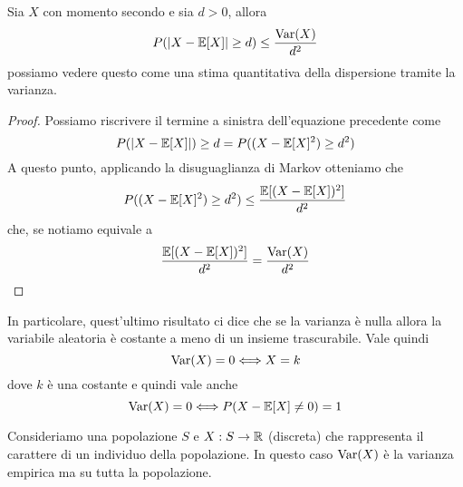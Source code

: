 \begin{proposition}
	Sia $X$ con momento secondo e sia $d > 0$, allora
	\[ P(|X - \mathbb{E}[X]| \geq d) \leq \frac{\operatorname{Var}(X)}{d^2} \]
	possiamo vedere questo come una stima quantitativa della dispersione tramite la varianza.
	\begin{proof}
		Possiamo riscrivere il termine a sinistra dell'equazione precedente come
		\[ P(|X - \mathbb{E}[X]|) \geq d = P((X - \mathbb{E}[X]^2) \geq d^2) \]
		A questo punto, applicando la disuguaglianza di Markov otteniamo che
		\[ P((X - \mathbb{E}[X]^2) \geq d^2) \leq \frac{\mathbb{E}[(X - \mathbb{E}[X])^2]}{d^2} \]
		che, se notiamo equivale a
		\[ \frac{\mathbb{E}[(X - \mathbb{E}[X])^2]}{d^2} = \frac{\operatorname{Var}(X)}{d^2} \]
	\end{proof}
\end{proposition}

In particolare, quest'ultimo risultato ci dice che se la varianza è nulla allora la variabile
aleatoria è costante a meno di un insieme trascurabile. Vale quindi
\[ \operatorname{Var}(X) = 0 \Longleftrightarrow X = k \]
dove $k$ è una costante e quindi vale anche
\[ \operatorname{Var}(X) = 0 \Longleftrightarrow P(X - \mathbb{E}[X] \neq 0) = 1 \]

\begin{example}
	Consideriamo una popolazione $S$ e $X : S \to \mathbb{R}$ (discreta) che rappresenta il carattere di un
	individuo della popolazione. In questo caso $\operatorname{Var}(X)$ è la varianza empirica ma su tutta la
	popolazione.
\end{example}